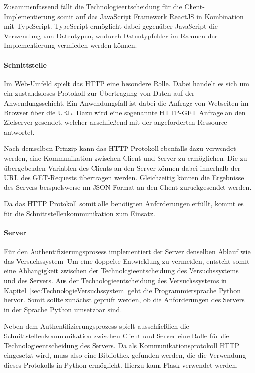 Zusammenfassend fällt die Technologieentscheidung für die Client-Implementierung somit auf das JavaScript Framework ReactJS in Kombination mit TypeScript.
TypeScript ermöglicht dabei gegenüber JavaScript die Verwendung von Datentypen, wodurch Datentypfehler im Rahmen der Implementierung vermieden werden können.

\paragraph{Schnittstelle}
Im Web-Umfeld spielt das \ac{HTTP} eine besondere Rolle.
Dabei handelt es sich um ein zustandsloses Protokoll zur Übertragung von Daten auf der Anwendungsschicht.
Ein Anwendungsfall ist dabei die Anfrage von Webseiten im Browser über die URL.
Dazu wird eine sogenannte \ac{HTTP}-GET Anfrage an den Zielserver gesendet, welcher anschließend mit der angeforderten Ressource antwortet.

Nach demselben Prinzip kann das HTTP Protokoll ebenfalls dazu verwendet werden, eine Kommunikation zwischen Client und Server zu ermöglichen.
Die zu übergebenden Variablen des Clients an den Server können dabei innerhalb der URL des GET-Requests übertragen werden.
Gleichzeitig können die Ergebnisse des Servers beispielsweise im JSON-Format an den Client zurückgesendet werden.

Da das HTTP Protokoll somit alle benötigten Anforderungen erfüllt, kommt es für die Schnittstellenkommunikation zum Einsatz.

\paragraph{Server}
Für den Authentifizierungsprozess implementiert der Server denselben Ablauf wie das Versuchssystem.
Um eine doppelte Entwicklung zu vermeiden, entsteht somit eine Abhängigkeit zwischen der Technologieentscheidung des Versuchssystems und des Servers.
Aus der Technologieentscheidung des Versuchssystems in Kapitel~\ref{sec:TechnologieVersuchssystem} geht die Programmiersprache Python hervor.
Somit sollte zunächst geprüft werden, ob die Anforderungen des Servers in der Sprache Python umsetzbar sind.

Neben dem Authentifizierungsprozess spielt ausschließlich die Schnittstellenkommunikation zwischen Client und Server eine Rolle für die Technologieentscheidung des Servers.
Da als Kommunikationsprotokoll HTTP eingesetzt wird, muss also eine Bibliothek gefunden werden, die die Verwendung dieses Protokolls in Python ermöglicht.
Hierzu kann Flask verwendet werden.

